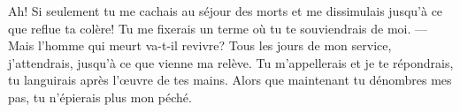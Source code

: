 Ah! Si seulement tu me cachais au séjour des morts
	et me dissimulais jusqu’à ce que reflue ta colère!
	Tu me fixerais un terme où tu te souviendrais de moi.
--- Mais l’homme qui meurt va-t-il revivre?
	Tous les jours de mon service, j’attendrais, jusqu’à ce que vienne ma relève.
Tu m’appellerais et je te répondrais,
	tu languirais après l’œuvre de tes mains.
Alors que maintenant tu dénombres mes pas,
	tu n’épierais plus mon péché.
